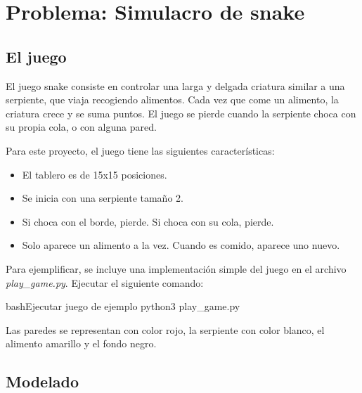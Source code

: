 \documentclass[letterpaper,11pt]{article} %
\begin{document}








\section{Problema: Simulacro de snake}
\subsection{El juego}
El juego snake consiste en controlar una larga y delgada criatura similar a una serpiente, que viaja recogiendo alimentos. Cada vez que come un alimento, la criatura crece y se suma puntos. El juego se pierde cuando la serpiente choca con su propia cola, o con alguna pared. 


Para este proyecto, el juego tiene las siguientes características:

\begin{itemize}
\item El tablero es de 15x15 posiciones.
\item Se inicia con una serpiente tamaño 2.
\item Si choca con el borde, pierde. Si choca con su cola, pierde.
\item Solo aparece un alimento a la vez. Cuando es comido, aparece uno nuevo.
\end{itemize}

Para ejemplificar, se incluye una implementación simple del juego en el archivo \textit{play\_game.py}. Ejecutar el siguiente comando:

\begin{sourcecode}[\label{playgame}]{bash}{Ejecutar juego de ejemplo}
python3 play_game.py
\end{sourcecode}

Las paredes se representan con color rojo, la serpiente con color blanco, el alimento amarillo y el fondo negro.

\subsection{Modelado}
\end{document}
